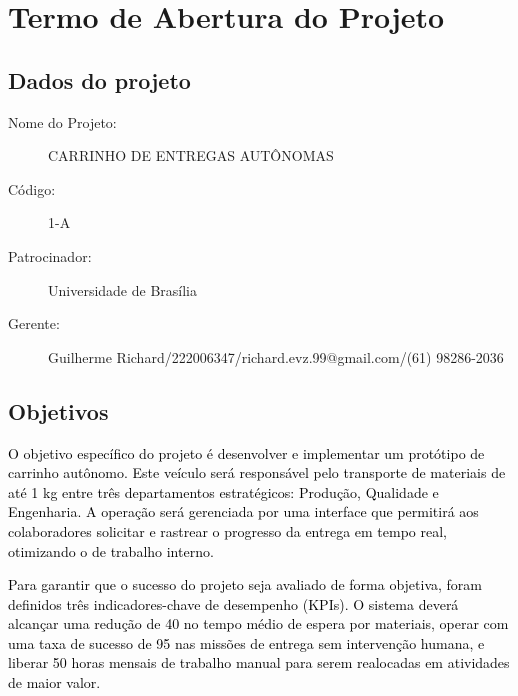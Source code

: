 \chapter[termodeaberturadoprojeto]{Termo de Abertura do Projeto}


\section{Dados do projeto}
\begin{description}
    \item [Nome do Projeto:] CARRINHO DE ENTREGAS AUTÔNOMAS 
    \item [Código:] 1-A
    \item [Patrocinador:] Universidade de Brasília
    \item [Gerente:] Guilherme Richard/222006347/richard.evz.99@gmail.com/(61) 98286-2036
\end{description}

\section{Objetivos}
%

\textcolor{black}{O objetivo específico do projeto é desenvolver e implementar um protótipo de carrinho autônomo. Este veículo será responsável pelo transporte de materiais de até 1 kg entre três departamentos estratégicos: Produção, Qualidade e Engenharia. A operação será gerenciada por uma interface que permitirá aos colaboradores solicitar e rastrear o progresso da entrega em tempo real, otimizando o de trabalho interno.}

\textcolor{black}{Para garantir que o sucesso do projeto seja avaliado de forma objetiva, foram definidos três indicadores-chave de desempenho (KPIs). O sistema deverá alcançar uma redução de 40 no tempo médio de espera por materiais, operar com uma taxa de sucesso de 95 nas missões de entrega sem intervenção humana, e liberar 50 horas mensais de trabalho manual para serem realocadas em atividades de maior valor.}

